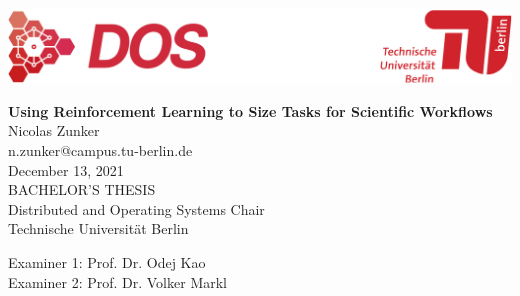 
\thispagestyle{empty}

\includegraphics[width=\linewidth]{fig/Logo_Header}
\mbox{}\\[1pc]
\begin{center}
    \huge{ \bfseries Using Reinforcement Learning to Size Tasks for Scientific Workflows}\\[2pc]

    \Large{Nicolas Zunker}\\
    \large{n.zunker@campus.tu-berlin.de}\\[1pc]
    \large{December 13, 2021}\\[2pc]

    BACHELOR'S THESIS\\
    Distributed and Operating Systems Chair\\
    Technische Universität Berlin
\end{center}
\vfill

Examiner 1: Prof. Dr. Odej Kao
\hfill{}\\
Examiner 2: Prof. Dr. Volker Markl

\afterpage{\null\thispagestyle{empty}\newpage}
